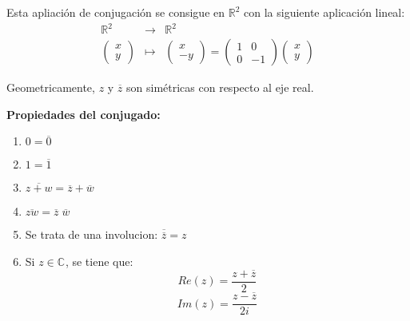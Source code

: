 Esta apliación de conjugación se consigue en \(\mathbb{R}^{2}\) con la siguiente aplicación lineal:
\begin{eqnarray*}
  \mathbb{R}^{2} & \longrightarrow & \mathbb{R}^{2} \\
  \begin{pmatrix}
    x\\
    y
  \end{pmatrix} & \longmapsto &
  \begin{pmatrix}
    x\\
    -y
  \end{pmatrix} = \begin{pmatrix}
    1 & 0\\
    0 & -1
  \end{pmatrix} \begin{pmatrix}
    x\\
    y
  \end{pmatrix} 
\end{eqnarray*}

Geometricamente, \(z\) y \(\overline{z}\) son simétricas con respecto al eje real.

\begin{center} %
\end{center}

\textbf{Propiedades del conjugado:}

\begin{enumerate}
  \item \(0 = \overline{0}\)
  \item \(1 = \overline{1}\)
  \item \(\overline{z+w} = \overline{z}+\overline{w}\)
  \item \(\overline{zw} = \overline{z} \; \overline{w}\)
  \item Se trata de una involucion: \(\overline{\overline{z}} = z\)
  \item Si \(z \in \mathbb{C}^{}\), se tiene que:
    \[ Re(z) = \frac{z+\overline{z}}{2}\]
    \[Im(z) = \frac{z-\overline{z}}{2i}\]
\end{enumerate}

